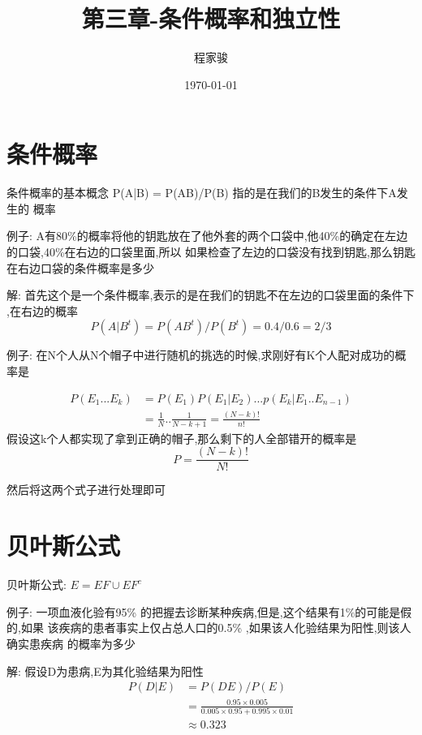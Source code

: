 \documentclass[UTF8]{ctexart}
\title{第三章-条件概率和独立性}
\author{程家骏}
\date{\today}
\begin{document}
\maketitle
\section{条件概率}
条件概率的基本概念 P(A|B) = P(AB)/P(B) 指的是在我们的B发生的条件下A发生的
概率
\par
例子: A有80\%的概率将他的钥匙放在了他外套的两个口袋中,他40\%的确定在左边的口袋,40\%在右边的口袋里面,所以
如果检查了左边的口袋没有找到钥匙,那么钥匙在右边口袋的条件概率是多少
\par 解: 首先这个是一个条件概率,表示的是在我们的钥匙不在左边的口袋里面的条件下
,在右边的概率
\begin{equation}
    P(A|B^t) = P(AB^t)/P(B^t) = 0.4/0.6 = 2/3 \nonumber
\end{equation}

\newline
\par 
例子: 在N个人从N个帽子中进行随机的挑选的时候,求刚好有K个人配对成功的概率是
\par 
\begin{equation}
\begin{aligned}
    P(E_1 ... E_k) &= P(E_1)P(E_1|E_2) ... p(E_k|E_1..E_{n-1})\nonumber\\
    &= \frac{1}{N} .. \frac{1}{N-k+1} = \frac{(N-k)!}{n!}
\end{aligned}
\end{equation}
假设这k个人都实现了拿到正确的帽子,那么剩下的人全部错开的概率是
\begin{equation}
    P = \frac{(N-k)!}{N!}\nonumber
\end{equation}


然后将这两个式子进行处理即可

\section{贝叶斯公式}
贝叶斯公式: $E = EF\cup EF^c$
\par 
例子: 一项血液化验有95\% 的把握去诊断某种疾病,但是,这个结果有1\%的可能是假的,如果
该疾病的患者事实上仅占总人口的0.5\% ,如果该人化验结果为阳性,则该人确实患疾病
的概率为多少
\par 
解:
假设D为患病,E为其化验结果为阳性
\begin{equation}
    \begin{aligned}
        P(D|E) &= P(DE)/P(E)\\ \nonumber
        &= \frac{0.95\times 0.005 }{0.005\times 0.95 + 0.995\times 0.01}\\
        &\approx 0.323
    \end{aligned}
\end{equation} 
\end{document}
